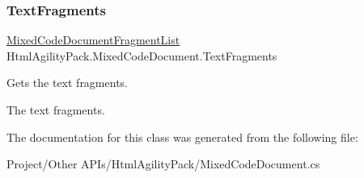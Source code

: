 \subsubsection{\texorpdfstring{Text\+Fragments}{TextFragments}}
{\footnotesize\ttfamily \hyperlink{class_html_agility_pack_1_1_mixed_code_document_fragment_list}{Mixed\+Code\+Document\+Fragment\+List} Html\+Agility\+Pack.\+Mixed\+Code\+Document.\+Text\+Fragments\hspace{0.3cm}{\ttfamily [get]}}



Gets the text fragments. 

The text fragments.

The documentation for this class was generated from the following file\+:\begin{DoxyCompactItemize}
\item 
Project/\+Other A\+P\+Is/\+Html\+Agility\+Pack/Mixed\+Code\+Document.\+cs\end{DoxyCompactItemize}
